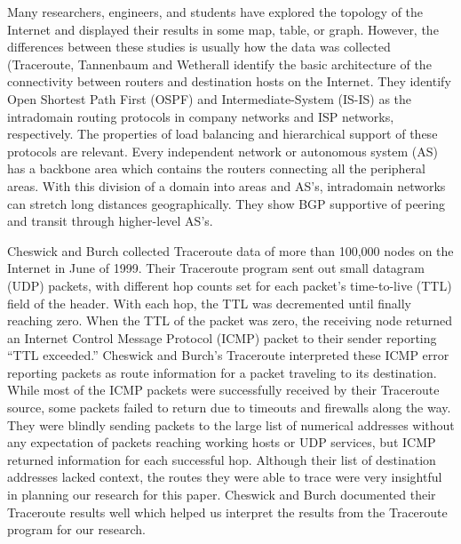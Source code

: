 \documentclass{sigcomm-alternate}
\begin{document}
Many researchers, engineers, and students have explored the topology of the Internet and displayed their results in some map, table, or graph. However, the differences between these studies is usually how the data was collected (Traceroute,  Tannenbaum and Wetherall \cite{tannenbaum} identify the basic architecture of the connectivity between routers and destination hosts on the Internet. They identify Open Shortest Path First (OSPF) and Intermediate-System (IS-IS) as the intradomain routing protocols in company networks and ISP networks, respectively. The properties of load balancing and hierarchical support of these protocols are relevant. Every independent network or autonomous system (AS) has a backbone area which contains the routers connecting all the peripheral areas. With this division of a domain into areas and AS's, intradomain networks can stretch long distances geographically. They show BGP supportive of peering and transit through higher-level AS's.

Cheswick and Burch \cite{ches} collected Traceroute data of more than 100,000 nodes on the Internet in June of 1999. Their Traceroute program sent out small datagram (UDP) packets, with different hop counts set for each packet’s time-to-live (TTL) field of the header. With each hop, the TTL was decremented until finally reaching zero. When the TTL of the packet was zero, the receiving node returned an Internet Control Message Protocol (ICMP) packet to their sender reporting “TTL exceeded.” Cheswick and Burch’s Traceroute interpreted these ICMP error reporting packets as route information for a packet traveling to its destination. While most of the ICMP packets were successfully received by their Traceroute source, some packets failed to return due to timeouts and firewalls along the way. They were blindly sending packets to the large list of numerical addresses without any expectation of packets reaching working hosts or UDP services, but ICMP returned information for each successful hop. Although their list of destination addresses lacked context, the routes they were able to trace were very insightful in planning our research for this paper. Cheswick and Burch documented their Traceroute results well which helped us interpret the results from the Traceroute program for our research.

\end{document}
